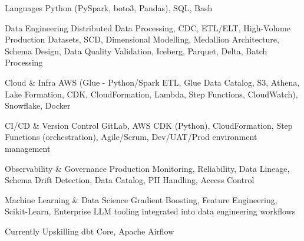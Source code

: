 
\begin{cvskills}

  \cvskill
    {Languages}
    {Python (PySpark, boto3, Pandas), SQL, Bash}

  \cvskill
    {Data Engineering}
    {Distributed Data Processing, CDC, ETL/ELT, High-Volume Production Datasets, SCD, Dimensional Modelling, Medallion Architecture, Schema Design, Data Quality Validation, Iceberg, Parquet, Delta, Batch Processing}

  \cvskill
    {Cloud \& Infra}
    {AWS (Glue - Python/Spark ETL, Glue Data Catalog, S3, Athena, Lake Formation, CDK, CloudFormation, Lambda, Step Functions, CloudWatch), Snowflake, Docker}

  \cvskill
    {CI/CD \& Version Control}
    {GitLab, AWS CDK (Python), CloudFormation, Step Functions (orchestration), Agile/Scrum, Dev/UAT/Prod environment management}

  \cvskill
    {Observability \& Governance}
    {Production Monitoring, Reliability, Data Lineage, Schema Drift Detection, Data Catalog, PII Handling, Access Control}

  \cvskill
    {Machine Learning \& Data Science}
    {Gradient Boosting, Feature Engineering, Scikit-Learn, Enterprise LLM tooling integrated into data engineering workflows}

  \cvskill
    {Currently Upskilling}
    {dbt Core, Apache Airflow}

\end{cvskills}
